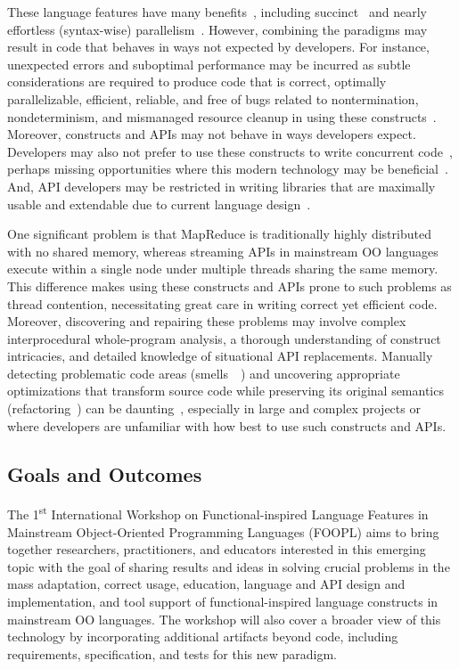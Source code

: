 \documentclass[10pt, conference]{IEEEtran}
\begin{document}
These language features have many benefits~\cite[Ch.~1]{Warburton2014}, including succinct~\cite{Mazinanian2017} and nearly effortless (syntax-wise) parallelism~\cite{OracleCorporation2015a}. However, combining the paradigms may result in code that behaves in ways not expected by developers. For instance, unexpected errors and suboptimal performance may be incurred as subtle considerations are required to produce code that is correct, optimally parallelizable, efficient, reliable, and free of bugs related to nontermination, nondeterminism, and mismanaged resource cleanup in using these constructs~\cite{Oracle2017d}. Moreover, constructs and APIs may not behave in ways developers expect. Developers may also not prefer to use these constructs to write concurrent code~\cite{Nielebock2018}, perhaps missing opportunities where this modern technology may be beneficial~\cite{Tang2018}. And, API developers may be restricted in writing libraries that are maximally usable and extendable due to current language design~\cite{Biboudis2015}.

One significant problem is that MapReduce is traditionally highly distributed with no shared memory, whereas streaming APIs in mainstream OO languages execute within a single node under multiple threads sharing the same memory. This difference makes using these constructs and APIs prone to such problems as thread contention, necessitating great care in writing correct yet efficient code. Moreover, discovering and repairing these problems may involve complex interprocedural whole-program analysis, a thorough understanding of construct intricacies, and detailed knowledge of situational API replacements. Manually detecting problematic code areas (smells~~\cite{Tufano2015,Fowler2008}) and uncovering appropriate optimizations that transform source code while preserving its original semantics (refactoring~\cite{Opdyke1992,Fowler1999}) can be daunting~\cite{Dig2009}, especially in large and complex projects or where developers are unfamiliar with how best to use such constructs and APIs.

\subsection{Goals and Outcomes}\label{sec:goals}

The 1\textsuperscript{st} International Workshop on Functional-inspired Language Features in Mainstream Object-Oriented Programming Languages (FOOPL) aims to bring together researchers, practitioners, and educators interested in this emerging topic with the goal of sharing results and ideas in solving crucial problems in the mass adaptation, correct usage, education, language and API design and implementation, and tool support of functional-inspired language constructs in mainstream OO languages. The workshop will also cover a broader view of this technology by incorporating additional artifacts beyond code, including requirements, specification, and tests for this new paradigm.
\end{document}
